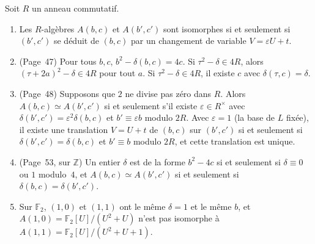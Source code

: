 \begin{enonce}
Soit $R$ un anneau commutatif.
\begin{enumerate}
\item Les $R$-algèbres $A(b, c)$ et $A(b', c')$ sont isomorphes si et seulement si $(b', c')$ se déduit de $(b, c)$ par un changement de variable $V = \varepsilon U + t$.
\item (Page~47) Pour tous $b, c$, $b^2 - \delta(b, c) = 4c$. Si $\tau^2 - \delta \in 4R$, alors $(\tau + 2a)^2 - \delta \in 4R$ pour tout $a$. Si $\tau^2 - \delta \in 4R$, il existe $c$ avec $\delta(\tau, c) = \delta$.
\item (Page~48) Supposons que $2$ ne divise pas zéro dans $R$. Alors $A(b, c) \simeq A(b', c')$ si et seulement s'il existe $\varepsilon \in R^\times$ avec $\delta(b', c') = \varepsilon^2\delta(b, c)$ et $b' \equiv \varepsilon b$ modulo $2R$. Avec $\varepsilon = 1$ (la base de $L$ fixée), il existe une translation $V = U + t$ de $(b, c)$ sur $(b', c')$ si et seulement si $\delta(b', c') = \delta(b, c)$ et $b' \equiv b$ modulo $2R$, et cette translation est unique.
\item (Page~53, sur $\mathbb Z$) Un entier $\delta$ est de la forme $b^2 - 4c$ si et seulement si $\delta \equiv 0$ ou $1$ modulo~$4$, et $A(b, c) \simeq A(b', c')$ si et seulement si $\delta(b, c) = \delta(b', c')$.
\item Sur $\mathbb F_2$, $(1, 0)$ et $(1, 1)$ ont le même $\delta = 1$ et le même $b$, et $A(1, 0) = \mathbb F_2[U]/(U^2 + U)$ n'est pas isomorphe à $A(1, 1) = \mathbb F_2[U]/(U^2 + U + 1)$.
\end{enumerate}
\end{enonce}

